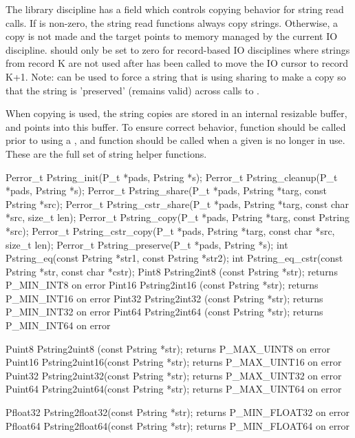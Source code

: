 The library discipline has a field  which controls
copying behavior for string read calls.  If  is
non-zero, the string read functions always copy strings. Otherwise, a
copy is not made and the target  points to memory managed by
the current IO discipline.   should only be set to
zero for record-based IO disciplines where strings from record K are
not used after  has been called to move the IO cursor
to record K+1.  Note:  can be used to force
a string that is using sharing to make a copy so that the string is
'preserved' (remains valid) across calls to .

When copying is used, the string copies are stored in an internal
resizable buffer, and  points into this buffer. 
To ensure correct behavior, function  should be called
prior to using a , and function  should
be called when a given  is no longer in use.
\\[1ex]
These are the full set of string helper functions.
\myvskip{1ex}
\begin{tinycodeaux}{\leftmargin=0in}
Perror\_t Pstring\_init(P\_t *pads, Pstring *s);
Perror\_t Pstring\_cleanup(P\_t *pads, Pstring *s);
Perror\_t Pstring\_share(P\_t *pads, Pstring *targ, const Pstring *src);
Perror\_t Pstring\_cstr\_share(P\_t *pads, Pstring *targ, const char *src, size\_t len);
Perror\_t Pstring\_copy(P\_t *pads, Pstring *targ, const Pstring *src);
Perror\_t Pstring\_cstr\_copy(P\_t *pads, Pstring *targ, const char *src, size\_t len);
Perror\_t Pstring\_preserve(P\_t *pads, Pstring *s);
int Pstring\_eq(const Pstring *str1, const Pstring *str2);
int Pstring\_eq\_cstr(const Pstring *str, const char *cstr);
Pint8    Pstring2int8  (const Pstring *str);  \/\* returns P\_MIN\_INT8 on error \*\/ 
Pint16   Pstring2int16 (const Pstring *str);  \/\* returns P\_MIN\_INT16 on error \*\/ 
Pint32   Pstring2int32 (const Pstring *str);  \/\* returns P\_MIN\_INT32 on error \*\/ 
Pint64   Pstring2int64 (const Pstring *str);  \/\* returns P\_MIN\_INT64 on error \*\/ 

Puint8   Pstring2uint8 (const Pstring *str);  \/\* returns P\_MAX\_UINT8 on error \*\/ 
Puint16  Pstring2uint16(const Pstring *str);  \/\* returns P\_MAX\_UINT16 on error \*\/ 
Puint32  Pstring2uint32(const Pstring *str);  \/\* returns P\_MAX\_UINT32 on error \*\/ 
Puint64  Pstring2uint64(const Pstring *str);  \/\* returns P\_MAX\_UINT64 on error \*\/ 

Pfloat32 Pstring2float32(const Pstring *str); \/\* returns P\_MIN\_FLOAT32 on error \*\/
Pfloat64 Pstring2float64(const Pstring *str); \/\* returns P\_MIN\_FLOAT64 on error \*\/
\end{tinycodeaux}
